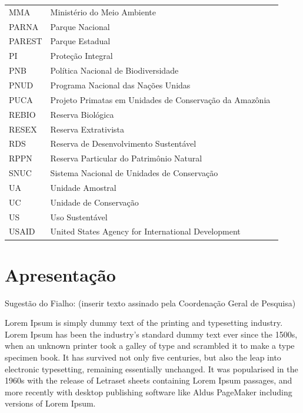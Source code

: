 \documentclass[
  letterpaper,
]{scrbook}
\begin{document}
\begin{longtable}[t]{l>{}l}
MMA & Ministério do Meio Ambiente \\
PARNA & Parque Nacional \\
PAREST & Parque Estadual \\
PI & Proteção Integral \\
\addlinespace
PNB & Política Nacional de Biodiversidade \\
PNUD & Programa Nacional das Nações Unidas \\
PUCA & Projeto Primatas em Unidades de Conservação da Amazônia \\
REBIO & Reserva Biológica \\
RESEX & Reserva Extrativista \\
\addlinespace
RDS & Reserva de Desenvolvimento Sustentável \\
RPPN & Reserva Particular do Patrimônio Natural \\
SNUC & Sistema Nacional de Unidades de Conservação \\
UA & Unidade Amostral \\
UC & Unidade de Conservação \\
\addlinespace
US & Uso Sustentável \\
USAID & United States Agency for International Development \\*

\end{longtable}


\chapter*{Apresentação}\label{apresentacao}


\pagestyle{plain}

Sugestão do Fialho: (inserir texto assinado pela Coordenação Geral de
Pesquisa)

Lorem Ipsum is simply dummy text of the printing and typesetting
industry. Lorem Ipsum has been the industry's standard dummy text ever
since the 1500s, when an unknown printer took a galley of type and
scrambled it to make a type specimen book. It has survived not only five
centuries, but also the leap into electronic typesetting, remaining
essentially unchanged. It was popularised in the 1960s with the release
of Letraset sheets containing Lorem Ipsum passages, and more recently
with desktop publishing software like Aldus PageMaker including versions
of Lorem Ipsum.
\end{document}
